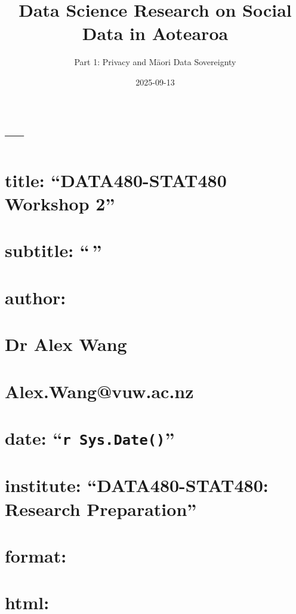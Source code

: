 \documentclass[
  12pt,
  ignorenonframetext,
]{beamer}
\title{Data Science Research on Social Data in Aotearoa}
\subtitle{Part 1: Privacy and Māori Data Sovereignty}
\author{}
\date{2025-09-13}
\institute{DATA480-STAT480: Research Preparation}
\begin{document}
\frame{\titlepage}


\section{---}\label{section}

\section{title: ``DATA480-STAT480 Workshop
2''}\label{title-data480-stat480-workshop-2}

\section{subtitle: ``\,''}\label{subtitle}

\section{author: \textbar{}}\label{author}

\section{Dr Alex Wang}\label{dr-alex-wang}

\section{Alex.Wang@vuw.ac.nz}\label{alex.wangvuw.ac.nz}

\section{\texorpdfstring{date:
``\texttt{r\ Sys.Date()}''}{date: ``r Sys.Date()''}}\label{date-r-sys.date}

\section{institute: ``DATA480-STAT480: Research
Preparation''}\label{institute-data480-stat480-research-preparation}

\section{format:}\label{format}

\section{html:}\label{html}
\end{document}
